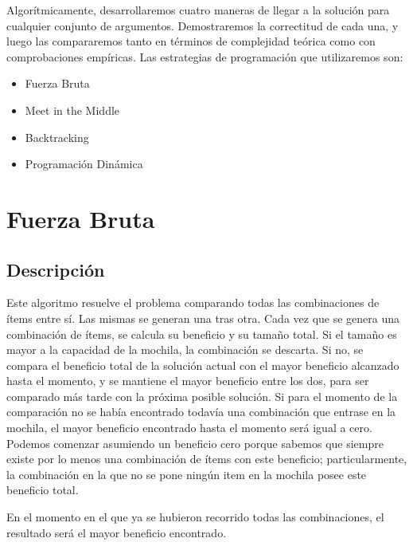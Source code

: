 \documentclass[10pt, a4paper]{article}
\begin{document}
Algorítmicamente, desarrollaremos cuatro maneras de llegar a la solución para cualquier conjunto de argumentos. Demostraremos la correctitud de cada una, y luego las compararemos tanto en términos de complejidad teórica como con comprobaciones empíricas. Las estrategias de programación que utilizaremos son:
\begin{itemize}
	\item Fuerza Bruta
	\item Meet in the Middle
	\item Backtracking
	\item Programación Dinámica
\end{itemize}

\section{Fuerza Bruta}
\subsection{Descripción}
Este algoritmo resuelve el problema comparando todas las combinaciones de ítems entre sí.
Las mismas se generan una tras otra. Cada vez que se genera una combinación de ítems, se calcula su beneficio y su tamaño total. Si el tamaño es mayor a la capacidad de la mochila, la combinación se descarta. Si no, se compara el beneficio total de la solución actual con el mayor beneficio alcanzado hasta el momento, y se mantiene el mayor beneficio entre los dos, para ser comparado más tarde con la próxima posible solución. Si para el momento de la comparación no se había encontrado todavía una combinación que entrase en la mochila, el mayor beneficio encontrado hasta el momento será igual a cero. Podemos comenzar asumiendo un beneficio cero porque sabemos que siempre existe por lo menos una combinación de ítems con este beneficio; particularmente, la combinación en la que no se pone ningún item en la mochila posee este beneficio total.\par
En el momento en el que ya se hubieron recorrido todas las combinaciones, el resultado será el mayor beneficio encontrado. \par
\end{document}
